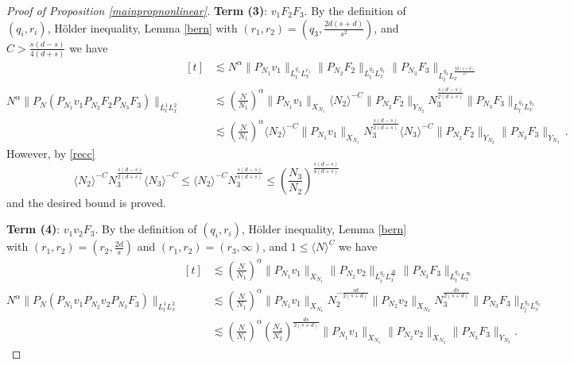 \documentclass[aihp]{imsart}
\numberwithin{equation}{section}
\theoremstyle{plain}
\theoremstyle{remark}
\begin{document}
\begin{proof}[Proof of Proposition \ref{mainpropnonlinear}]
\textbf{Term (3)}: $v_1 F_2 F_3$.
 By the definition of $(q_i, r_i)$, H\" older inequality,  Lemma \ref{bern} with $(r_1, r_2) = (q_3, \frac{2d(s+d)}{s^2})$, and $C > \frac{s(d-s)}{4(d + s)}$ we have
\begin{equation*}
 N^\alpha \|P_N (P_{N_1} v_1  P_{N_2} F_2 P_{N_3} F_3) \|_{L_t^{1} L_x^{2}}
\begin{aligned}[t]
& \lesssim  N^\alpha \|P_{N_1} v_1\|_{L^{q_1}_tL^{r_1}_x} \|P_{N_2} F_2\|_{L_t^{q_2 } L_x^{q_3} } \|P_{N_3} F_3\|_{L_t^{q_3} L_x^{\frac{2d(s+d)}{s^2}}}\\
& \lesssim \left(\frac{N}{N_1}\right)^\alpha \|P_{N_1} v_1\|_{X_{N_1}} \langle N_2\rangle^{-C} \|P_{N_2} F_2\|_{Y_{N_2} }   N_3^{\frac{s(d-s)}{2(d + s)}} \|P_{N_3} F_3\|_{L_t^{q_3}L_x^{q_3}}  \\
&\lesssim  \left(\frac{N}{N_1}\right)^\alpha \langle N_2\rangle^{-C} \|P_{N_1} v_1\|_{X_{N_1}} N_3^{\frac{s(d-s)}{2(d + s)}} \langle N_3\rangle^{-C}\|P_{N_2} F_2\|_{Y_{N_2}} \|P_{N_3} F_3\|_{Y_{N_3}} \,.
\end{aligned}
\end{equation*}
However, by \eqref{recc}
$$
\langle N_2\rangle^{-C} N_3^{\frac{s(d-s)}{2(d + s)}} \langle N_3\rangle^{-C} \leq \langle N_2\rangle^{-C} N_3^{\frac{s(d-s)}{4(d + s)}} \leq  \left(\frac{N_3}{N_2}\right)^{\frac{s(d-s)}{4(d + s)}}
$$
and the desired bound is proved. 


\textbf{Term (4)}:  $v_1 v_2 F_3$.
 By the definition of $(q_i, r_i)$, H\" older inequality,  Lemma \ref{bern} with $(r_1, r_2) = (r_2, \frac{2d}{s})$ and $(r_1, r_2) = (r_3, \infty)$, and $1 \leq \langle N\rangle^C $ we have
\begin{equation*}
N^\alpha \|P_N (P_{N_1} v_1  P_{N_2} v_2 P_{N_3} F_3) \|_{L_t^{1} L_x^{2}}
\begin{aligned}[t]
& \lesssim \left(\frac{N}{N_1}\right)^\alpha \|P_{N_1} v_1\|_{X_{N_1}} \|P_{N_2} v_2\|_{L_t^{q_2} L_x^{\frac{2d}{s} }} \|P_{N_3} F_3\|_{L_t^{q_3} L_x^{\infty}}\\
& \lesssim \left(\frac{N}{N_1}\right)^\alpha \|P_{N_1} v_1\|_{X_{N_1}}   N_2^{-\frac{sd}{2(s+d)}} \|P_{N_2} v_2\|_{X_{N_2}} N_3^{\frac{ds}{2(s+d)}}\|P_{N_3} F_3\|_{ L_t^{q_3 } L_x^{q_3} }  \\
&\lesssim  \left(\frac{N}{N_1}\right)^\alpha \left(\frac{N_3}{N_2}\right)^{\frac{ds}{2(s+d)}} \|P_{N_1} v_1\|_{X_{N_1}}  \|P_{N_2} v_2\|_{X_{N_2}} \|P_{N_3} F_3\|_{Y_{N_3}}.
\end{aligned}
\end{equation*}


\end{proof}
\end{document}
